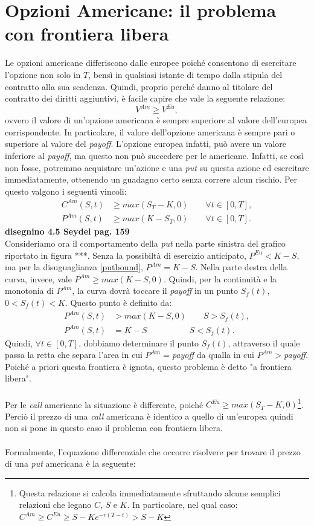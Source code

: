 \documentclass[a4paper,10pt]{report}
\theoremstyle{osservazione}
\theoremstyle{esempio}
\theoremstyle{notazione}
\theoremstyle{corollario}
\begin{document}
\section{Opzioni Americane: il problema con frontiera libera}
Le opzioni americane differiscono dalle europee poich\'e consentono di esercitare l'opzione non solo in $T$, bens\`i in qualsiasi istante di tempo dalla stipula del contratto alla sua scadenza. Quindi, proprio perch\'e danno al titolare del contratto dei diritti aggiuntivi, \`e facile capire che vale la seguente relazione: $$V^{Am}\geq V^{Eu},$$ ovvero il valore di un'opzione americana \`e sempre superiore al valore dell'europea corrispondente. In particolare, il valore dell'opzione americana \`e sempre pari o superiore al valore del \emph{payoff}. L'opzione europea infatti, pu\`o avere un valore inferiore al \emph{payoff}, ma questo non pu\`o succedere per le americane. Infatti, se cos\`i non fosse, potremmo acquistare un'azione e una \emph{put} su questa azione ed esercitare immediatamente, ottenendo un guadagno certo senza correre alcun rischio. Per questo valgono i seguenti vincoli:
\begin{align}
C^{Am}(S,t)&\geq max(S_T-K,0)\qquad\forall t\in[0,T],\\
P^{Am}(S,t)&\geq max(K-S_T,0)\qquad\forall t\in[0,T].
\label{putbound}
\end{align}
\textbf{disegnino 4.5 Seydel pag. 159}\\
Consideriamo ora il comportamento della \emph{put} nella parte sinistra del grafico riportato in figura ***. Senza la possibilt\`a di esercizio anticipato, $P^{Eu}<K-S$, ma per la disuguaglianza \ref{putbound}, $P^{Am}=K-S$. Nella parte destra della curva, invece, vale $P^{Am}\geq max(K-S,0)$. Quindi, per la continuit\`a e la monotonia di $P^{Am}$, la curva dovr\`a toccare il \emph{payoff} in un punto $S_f(t)$, $0<S_f(t)<K$. Questo punto \`e definito da:
\begin{align*}
P^{Am}(S,t)&>max(K-S,0)\qquad S>S_f(t),\\
P^{Am}(S,t)&=K-S\qquad\qquad\quad S<S_f(t).
\end{align*}
Quindi, $\forall t\in[0,T]$, dobbiamo determinare il punto $S_f(t)$, attraverso il quale passa la retta che separa l'area in cui $P^{Am}=$\emph{payoff} da qualla in cui $P^{Am}>$\emph{payoff}. Poich\'e a priori questa frontiera \`e ignota, questo problema \`e detto "a frontiera libera".\\\\Per le \emph{call} americane la situazione \`e differente, poich\'e $C^{Eu}\geq max(S_T-K,0)$\footnote{Questa relazione si calcola immediatamente sfruttando alcune semplici relazioni che legano $C$, $S$ e $K$. In particolare, nel qual caso: $C^{Am}\geq C^{Eu} \geq S-Ke^{-r(T-t)} > S-K$}. Perci\`o il prezzo di una \emph{call} americana \`e identico a quello di un'europea quindi non si pone in questo caso il problema con frontiera libera.\\\\Formalmente, l'equazione differenziale che occorre risolvere per trovare il prezzo di una \emph{put} americana \`e la seguente:
\end{document}
